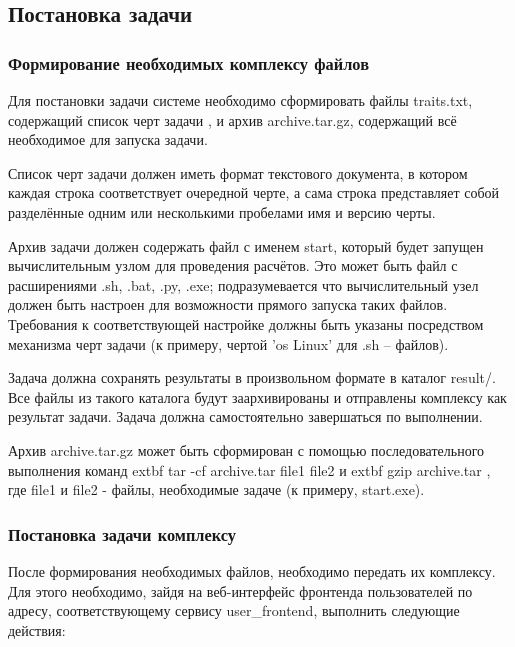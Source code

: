 \documentclass[a4paper,12pt]{report}
\numberwithin{equation}{section}
\begin{document}
  \subsection{Постановка задачи}
  \subsubsection{Формирование необходимых комплексу файлов}
  Для постановки задачи системе необходимо сформировать файлы traits.txt, содержащий список черт задачи
  , и архив archive.tar.gz, содержащий всё необходимое для запуска задачи.
  
  Список черт задачи должен иметь формат текстового документа, в котором каждая строка
  соответствует очередной черте, а сама строка представляет собой разделённые одним или несколькими пробелами имя и версию черты.
  
  Архив задачи должен содержать файл с именем start, который будет запущен вычислительным узлом для проведения расчётов.
  Это может быть файл с расширениями .sh, .bat, .py, .exe; подразумевается что вычислительный узел должен быть настроен для возможности прямого запуска таких файлов.
  Требования к соответствующей настройке должны быть указаны посредством механизма черт задачи (к примеру, чертой 'os Linux' для .sh -- файлов).
  
  Задача должна сохранять результаты в произвольном формате в каталог result/. 
  Все файлы из такого каталога будут заархивированы и отправлены комплексу как результат задачи.
  Задача должна самостоятельно завершаться по выполнении.
  
  Архив archive.tar.gz может быть сформирован с помощью последовательного выполнения команд
  extbf{ tar -cf archive.tar file1 file2 } и 
  extbf{ gzip archive.tar }
  , где file1 и file2 - файлы, необходимые задаче (к примеру, start.exe).
  
  \subsubsection{Постановка задачи комплексу}
  После формирования необходимых файлов, необходимо передать их комплексу.
  Для этого необходимо, зайдя на веб-интерфейс фронтенда пользователей по адресу, соответствующему сервису user\_frontend, выполнить следующие действия:
  
\end{document}
